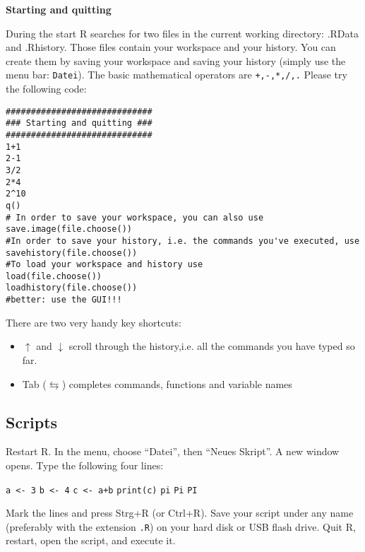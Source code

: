 \documentclass{article}
\begin{document}
\begin{solution}
\textbf{Starting and quitting}

During the start R searches for two files in the current working directory: .RData and .Rhistory. Those files contain your workspace and your history. You can create them by saving your workspace and saving your history (simply use the menu bar: \texttt{Datei}). The basic mathematical operators are \texttt{+,-,*,/,.} Please try the following code:

\begin{verbatim}
#############################
### Starting and quitting ###
#############################
1+1
2-1
3/2
2*4
2^10
q()
# In order to save your workspace, you can also use
save.image(file.choose())
#In order to save your history, i.e. the commands you've executed, use
savehistory(file.choose())
#To load your workspace and history use
load(file.choose())
loadhistory(file.choose())
#better: use the GUI!!!
\end{verbatim}

There are two very handy key shortcuts:
\begin{itemize}
    \item $\uparrow $ and $\downarrow $ scroll through the history,i.e.
        all the commands you have typed so far.
    \item Tab ($\leftrightarrows $) completes commands, functions and
        variable names
\end{itemize}
\end{solution}

\subsection{Scripts}

Restart R. In the menu, choose \textquotedblleft Datei\textquotedblright , then \textquotedblleft Neues Skript\textquotedblright . A new window opens. Type the following four lines:

\texttt{a <- 3}\newline
\texttt{b <- 4}\newline
\texttt{c <- a+b}\newline
\texttt{print(c)}
\texttt{pi}
\texttt{Pi}
\texttt{PI}

Mark the lines and press Strg+R (or Ctrl+R). Save your script under any name (preferably with the extension \texttt{.R}) on your hard disk or USB flash drive. Quit R, restart, open the script, and execute it.
\end{document}
